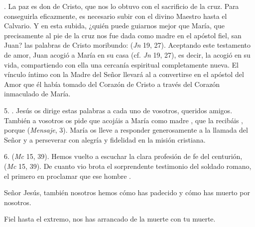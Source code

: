 \begin{body}
. La paz es don de Cristo, que nos lo obtuvo con el sacrificio de la cruz. Para conseguirla eficazmente, es necesario subir con el divino Maestro hasta el Calvario. Y en esta subida, ¿quién puede guiarnos mejor que María, que precisamente al pie de la cruz nos fue dada como madre en el apóstol fiel, san Juan?  las palabras de Cristo moribundo:  (\textit{Jn} 19, 27). Aceptando este testamento de amor, Juan acogió a María en su casa (cf. \textit{Jn} 19, 27), es decir, la acogió en su vida, compartiendo con ella una cercanía espiritual completamente nueva. El vínculo íntimo con la Madre del Señor llevará al  a convertirse en el apóstol del Amor que él había tomado del Corazón de Cristo a través del Corazón inmaculado de María.

5. . Jesús os dirige estas palabras a cada uno de vosotros, queridos amigos. También a vosotros os pide que acojáis a María como madre , que la recibáis , porque  (\textit{Mensaje}, 3). María os lleve a responder generosamente a la llamada del Señor y a perseverar con alegría y fidelidad en la misión cristiana.


6.  (\textit{Mc} 15, 39). Hemos vuelto a escuchar la clara profesión de fe del centurión,  (\textit{Mc} 15, 39). De cuanto vio brota el sorprendente testimonio del soldado romano, el primero en proclamar que ese hombre .


\newpage
\begin{bodyprose}
Señor Jesús,
   también nosotros hemos 
   cómo has padecido
   y cómo has muerto por nosotros.

Fiel hasta el extremo,
   nos has arrancado de la muerte
   con tu muerte.


\end{bodyprose}
\end{body}
